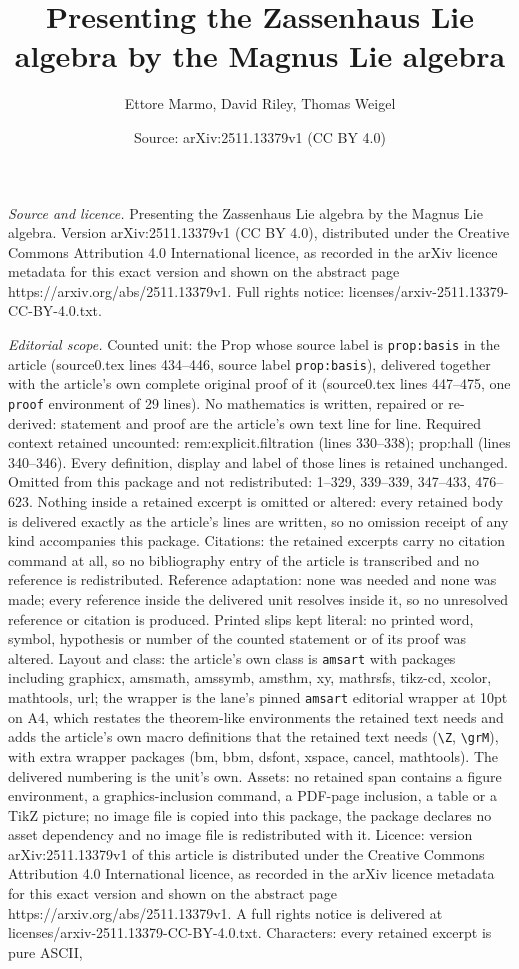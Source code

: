 \documentclass[10pt,a4paper]{amsart}
\title[Presenting the Zassenhaus Lie algebra by the Magnus Lie alge]{Presenting the Zassenhaus Lie algebra by the Magnus Lie algebra}
\author{Ettore Marmo, David Riley, Thomas Weigel}
\date{Source: arXiv:2511.13379v1 (CC BY 4.0)}
\begin{document}
\maketitle

\noindent\emph{Source and licence.} Presenting the Zassenhaus Lie algebra by the Magnus Lie algebra. Version arXiv:2511.13379v1 (CC BY 4.0), distributed under the Creative Commons Attribution 4.0 International licence, as recorded in the arXiv licence metadata for this exact version and shown on the abstract page https://arxiv.org/abs/2511.13379v1. Full rights notice: licenses/arxiv-2511.13379-CC-BY-4.0.txt.\par\smallskip

\noindent\textit{Editorial scope.} Counted unit: the Prop whose source label is \texttt{prop:basis} in the article (source0.tex lines 434--446, source label \texttt{prop:basis}), delivered together with the article's own complete original proof of it (source0.tex lines 447--475, one \texttt{proof} environment of 29 lines). No mathematics is written, repaired or re-derived: statement and proof are the article's own text line for line. Required context retained uncounted: rem:explicit.filtration (lines 330--338); prop:hall (lines 340--346). Every definition, display and label of those lines is retained unchanged. Omitted from this package and not redistributed: 1--329, 339--339, 347--433, 476--623. Nothing inside a retained excerpt is omitted or altered: every retained body is delivered exactly as the article's lines are written, so no omission receipt of any kind accompanies this package. Citations: the retained excerpts carry no citation command at all, so no bibliography entry of the article is transcribed and no reference is redistributed. Reference adaptation: none was needed and none was made; every reference inside the delivered unit resolves inside it, so no unresolved reference or citation is produced. Printed slips kept literal: no printed word, symbol, hypothesis or number of the counted statement or of its proof was altered. Layout and class: the article's own class is \texttt{amsart} with packages including graphicx, amsmath, amssymb, amsthm, xy, mathrsfs, tikz-cd, xcolor, mathtools, url; the wrapper is the lane's pinned \texttt{amsart} editorial wrapper at 10pt on A4, which restates the theorem-like environments the retained text needs and adds the article's own macro definitions that the retained text needs (\texttt{\textbackslash Z}, \texttt{\textbackslash grM}), with extra wrapper packages (bm, bbm, dsfont, xspace, cancel, mathtools). The delivered numbering is the unit's own. Assets: no retained span contains a figure environment, a graphics-inclusion command, a PDF-page inclusion, a table or a TikZ picture; no image file is copied into this package, the package declares no asset dependency and no image file is redistributed with it. Licence: version arXiv:2511.13379v1 of this article is distributed under the Creative Commons Attribution 4.0 International licence, as recorded in the arXiv licence metadata for this exact version and shown on the abstract page https://arxiv.org/abs/2511.13379v1. A full rights notice is delivered at licenses/arxiv-2511.13379-CC-BY-4.0.txt. Characters: every retained excerpt is pure ASCII, 
\end{document}
